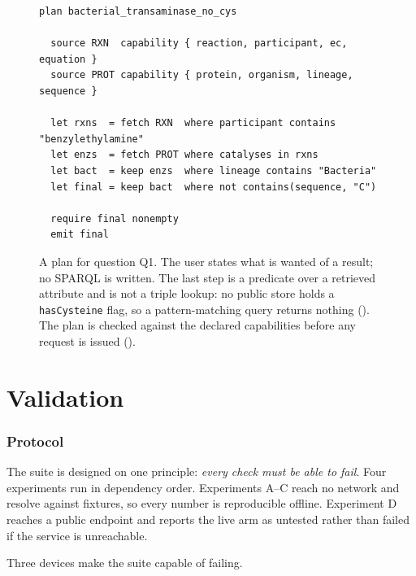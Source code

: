 \documentclass[11pt,twocolumn,a4paper]{article}
\theoremstyle{thmstyle}
\theoremstyle{definition}
\theoremstyle{remark}
\begin{document}
\begin{figure}[t]
\centering
\begin{lstlisting}
plan bacterial_transaminase_no_cys

  source RXN  capability { reaction, participant, ec, equation }
  source PROT capability { protein, organism, lineage, sequence }

  let rxns  = fetch RXN  where participant contains "benzylethylamine"
  let enzs  = fetch PROT where catalyses in rxns
  let bact  = keep enzs  where lineage contains "Bacteria"
  let final = keep bact  where not contains(sequence, "C")

  require final nonempty
  emit final
\end{lstlisting}
\caption{A plan for question Q1. The user states what is wanted of a result;
no SPARQL is written. The last step is a predicate over a retrieved attribute
and is not a triple lookup: no public store holds a \texttt{hasCysteine} flag,
so a pattern-matching query returns nothing (). The plan is
checked against the declared capabilities before any request is issued
().}
\label{fig:plan}
\end{figure}

\part{Validation}

\section{Protocol}
\label{sec:protocol}

The suite is designed on one principle: \emph{every check must be able to
fail}. Four experiments run in dependency order. Experiments A--C reach no
network and resolve against fixtures, so every number is reproducible offline.
Experiment D reaches a public endpoint and reports the live arm as untested
rather than failed if the service is unreachable.

Three devices make the suite capable of failing.
\end{document}
